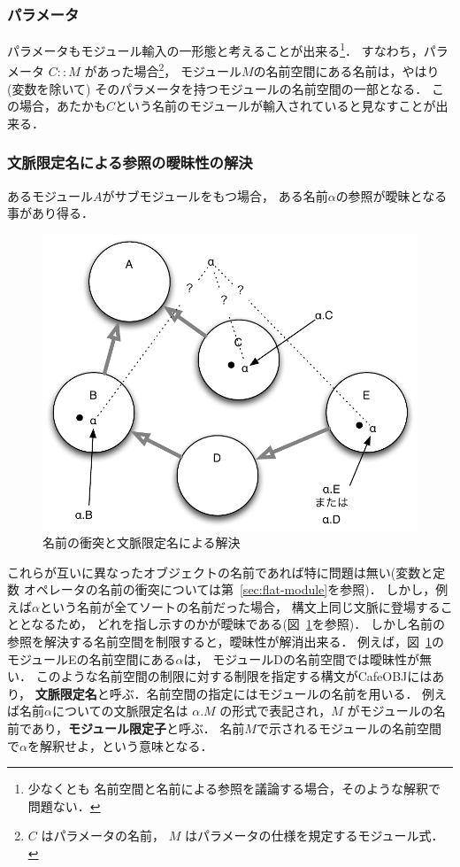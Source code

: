 \documentclass[a4paper,oneside,10pt]{memoir}
\begin{document}
\subsubsection{パラメータ}
パラメータもモジュール輸入の一形態と考えることが出来る\footnote{少なくとも%
名前空間と名前による参照を議論する場合，そのような解釈で問題ない．}．
すなわち，パラメータ $C :: M$ があった場合\footnote{$C$ はパラメータの名前，
$M$ はパラメータの仕様を規定するモジュール式．}，
モジュール$M$の名前空間にある名前は，やはり(変数を除いて)%
そのパラメータを持つモジュールの名前空間の一部となる．
この場合，あたかも$C$という名前のモジュールが輸入されていると見なすことが出来る．

\subsubsection{文脈限定名による参照の曖昧性の解決}
\label{sec:qualified-name}
あるモジュール$A$がサブモジュールをもつ場合，
ある名前$\alpha$の参照が曖昧となる事があり得る．
\begin{figure}
\begin{center}
\includegraphics[scale=0.7]{disunbig.pdf}
\end{center}
\caption{名前の衝突と文脈限定名による解決}
\label{fig:disunbig}
\end{figure}
これらが互いに異なったオブジェクトの名前であれば特に問題は無い(変数と定数%
オペレータの名前の衝突については第~\ref{sec:flat-module}を参照)．
しかし，例えば$\alpha$という名前が全てソートの名前だった場合，
構文上同じ文脈に登場することとなるため，%
どれを指し示すのかが曖昧である(図~\ref{fig:disunbig}を参照)．
しかし名前の参照を解決する名前空間を制限すると，曖昧性が解消出来る．
例えば，図~\ref{fig:disunbig}のモジュールEの名前空間にある$\alpha$は，
モジュールDの名前空間では曖昧性が無い．
このような名前空間の制限に対する制限を指定する構文がCafeOBJにはあり，%
\textbf{文脈限定名}と呼ぶ．名前空間の指定にはモジュールの名前を用いる．
例えば名前$\alpha$についての文脈限定名は $\alpha.M$ の形式で表記され，$M$%
がモジュールの名前であり，\textbf{モジュール限定子}と呼ぶ．
名前$M$で示されるモジュールの名前空間で$\alpha$を解釈せよ，という意味となる．
\end{document}
